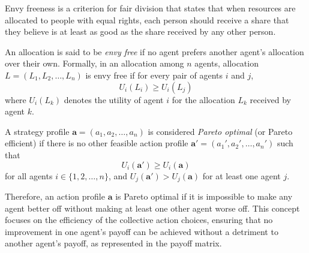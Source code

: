 \begin{definition}
Envy freeness is a criterion for fair division that states that when resources are allocated to people with equal rights, each person should receive a share that they believe is at least as good as the share received by any other person. 

An allocation is said to be \emph{envy free} if no agent prefers another agent's allocation over their own. Formally, in an allocation among $n$ agents, allocation $L = (L_1, L_2, \dots, L_n)$ is envy free if for every pair of agents $i$ and $j$, $$U_i(L_i)\geq U_i(L_j)$$ where $U_i(L_k)$ denotes the utility of agent $i$ for the allocation $L_k$ received by agent $k$.
\end{definition}

\begin{definition}
A strategy profile $\mathbf{a} = (a_1,a_2,\dots, a_n)$ is considered \emph{Pareto optimal} (or Pareto efficient) if there is no other feasible action profile $\mathbf{a'} = (a_1',a_2',\dots, a_n')$ such that $$U_i(\mathbf{a'})\geq U_i(\mathbf{a})$$ for all agents $i\in\{1, 2, \dots, n\}$, and $U_j(\mathbf{a'})> U_j(\mathbf{a})$ for at least one agent $j$.

Therefore, an action profile $\mathbf{a}$ is Pareto optimal if it is impossible to make any agent better off without making at least one other agent worse off. This concept focuses on the efficiency of the collective action choices, ensuring that no improvement in one agent's payoff can be achieved without a detriment to another agent's payoff, as represented in the payoff matrix.
\end{definition}
